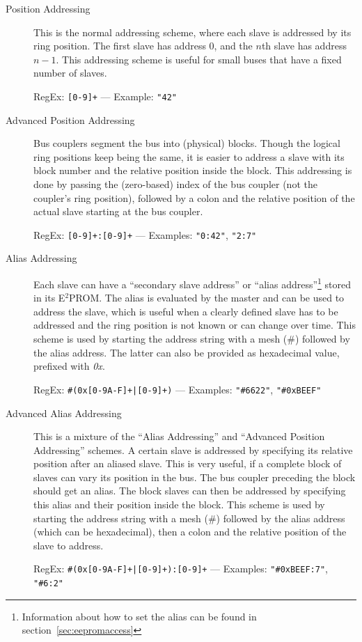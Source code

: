 \documentclass[a4paper,12pt,BCOR6mm,bibtotoc,idxtotoc]{scrbook}
\begin{document}
\begin{description}

\item[Position Addressing] This is the normal addressing scheme, where each
slave is addressed by its ring position. The first slave has address 0, and the
$n$th slave has address $n - 1$. This addressing scheme is useful for small
buses that have a fixed number of slaves.

RegEx: \texttt{[0-9]+} --- Example: \texttt{"42"}

\item[Advanced Position Addressing] Bus couplers segment the bus into
(physical) blocks. Though the logical ring positions keep being the same, it is
easier to address a slave with its block number and the relative position
inside the block. This addressing is done by passing the (zero-based) index of
the bus coupler (not the coupler's ring position), followed by a colon and the
relative position of the actual slave starting at the bus coupler.

RegEx: \texttt{[0-9]+:[0-9]+} --- Examples: \texttt{"0:42"}, \texttt{"2:7"}

\item[Alias Addressing] Each slave can have a ``secondary slave address'' or
``alias address''\footnote{Information about how to set the alias can be found
in section~\ref{sec:eepromaccess}} stored in its E$^2$PROM.  The alias is
evaluated by the master and can be used to address the slave, which is useful
when a clearly defined slave has to be addressed and the ring position is not
known or can change over time. This scheme is used by starting the address
string with a mesh (\#) followed by the alias address.  The latter can also be
provided as hexadecimal value, prefixed with \textit{0x}.

RegEx: \texttt{\#(0x[0-9A-F]+|[0-9]+)} --- Examples: \texttt{"\#6622"},
\texttt{"\#0xBEEF"}

\item[Advanced Alias Addressing] This is a mixture of the ``Alias Addressing''
and ``Advanced Position Addressing'' schemes. A certain slave is addressed by
specifying its relative position after an aliased slave. This is very useful,
if a complete block of slaves can vary its position in the bus. The bus coupler
preceding the block should get an alias. The block slaves can then be addressed
by specifying this alias and their position inside the block. This scheme is
used by starting the address string with a mesh (\#) followed by the alias
address (which can be hexadecimal), then a colon and the relative position of
the slave to address.

RegEx: \texttt{\#(0x[0-9A-F]+|[0-9]+):[0-9]+} --- Examples:
\texttt{"\#0xBEEF:7"}, \texttt{"\#6:2"}

\end{description}
\end{document}
